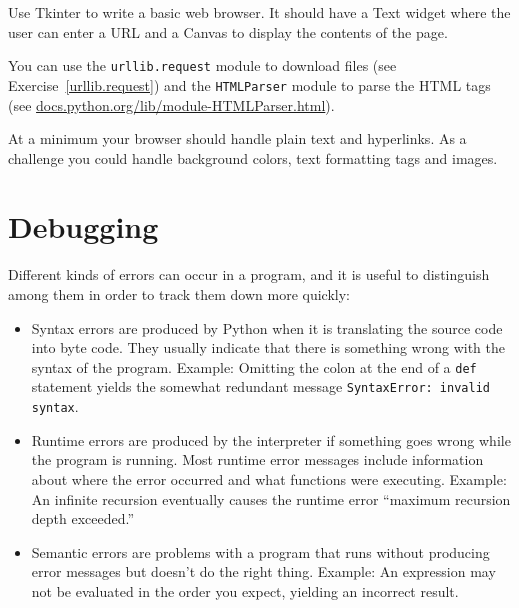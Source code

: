 \documentclass[10pt]{book}
\begin{document}
\begin{ex}

Use Tkinter to write a basic web browser.  It
should have a Text widget where the user can enter a URL
and a Canvas to display the contents of the page.


You can use the {\tt urllib.request} module to download files
(see Exercise~\ref{urllib.request}) and
the {\tt HTMLParser} module to parse the HTML
tags (see \url{docs.python.org/lib/module-HTMLParser.html}).


At a minimum your browser should handle plain text and hyperlinks.  As
a challenge you could handle background colors, text
formatting tags and images.

\end{ex}



\appendix

\chapter{Debugging}

Different kinds of errors can occur
in a program, and it is useful to distinguish among them
in order to track them down more quickly:

\begin{itemize}

\item Syntax errors are produced by Python when it is translating the
  source code into byte code.  They usually indicate that there is
  something wrong with the syntax of the program.  Example: Omitting
  the colon at the end of a {\tt def} statement yields the somewhat
  redundant message {\tt SyntaxError: invalid syntax}.

\item Runtime errors are produced by the interpreter if something goes
  wrong while the program is running.  Most runtime error messages
  include information about where the error occurred and what
  functions were executing.  Example: An infinite recursion eventually
  causes the runtime error ``maximum recursion depth exceeded.''

\item Semantic errors are problems with a program that runs without
  producing error messages but doesn't do the right thing.  Example:
  An expression may not be evaluated in the order you expect, yielding
  an incorrect result.

\end{itemize}
\end{document}
